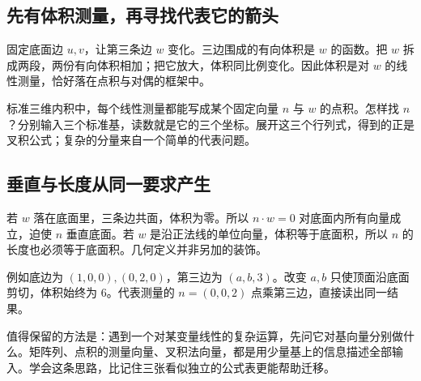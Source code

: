 \subsection*{先有体积测量，再寻找代表它的箭头}
固定底面边 $u,v$，让第三条边 $w$ 变化。三边围成的有向体积是 $w$ 的函数。把 $w$ 拆成两段，两份有向体积相加；把它放大，体积同比例变化。因此体积是对 $w$ 的线性测量，恰好落在点积与对偶的框架中。

标准三维内积中，每个线性测量都能写成某个固定向量 $n$ 与 $w$ 的点积。怎样找 $n$？分别输入三个标准基，读数就是它的三个坐标。展开这三个行列式，得到的正是叉积公式；复杂的分量来自一个简单的代表问题。

\subsection*{垂直与长度从同一要求产生}
若 $w$ 落在底面里，三条边共面，体积为零。所以 $n\cdot w=0$ 对底面内所有向量成立，迫使 $n$ 垂直底面。若 $w$ 是沿正法线的单位向量，体积等于底面积，所以 $n$ 的长度也必须等于底面积。几何定义并非另加的装饰。

例如底边为 $(1,0,0),(0,2,0)$，第三边为 $(a,b,3)$。改变 $a,b$ 只使顶面沿底面剪切，体积始终为 $6$。代表测量的 $n=(0,0,2)$ 点乘第三边，直接读出同一结果。

值得保留的方法是：遇到一个对某变量线性的复杂运算，先问它对基向量分别做什么。矩阵列、点积的测量向量、叉积法向量，都是用少量基上的信息描述全部输入。学会这条思路，比记住三张看似独立的公式表更能帮助迁移。
